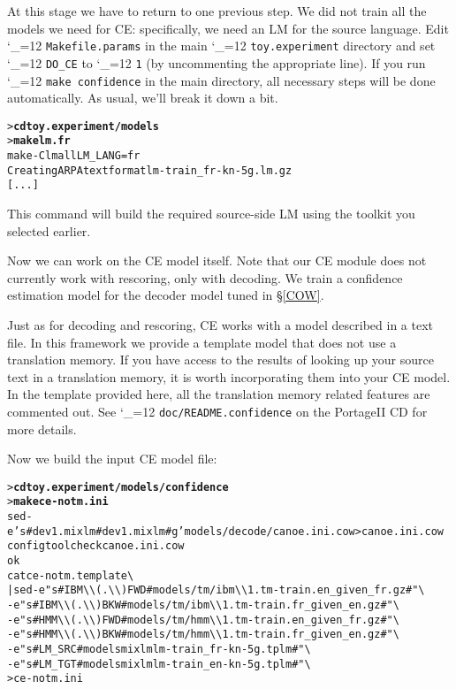 \documentclass[11pt,letterpaper]{article}
\newcommand{\bs}{\textbackslash{}}
\newcommand{\PS}{PortageII\xspace}
\def\code{\begingroup\catcode`\_=12 \codex}
\newcommand{\codex}[1]{\texttt{#1}\endgroup}
\begin{document}
At this stage we have to return to one previous step. We did not train all
the models we need for CE: specifically, we need an LM for the source language.
Edit \code{Makefile.params} in the main \code{toy.experiment} directory and set
\code{DO_CE} to \code{1} (by uncommenting the appropriate line). If you run
\code{make confidence} in the main directory, all necessary steps will be done
automatically.  As usual, we'll break it down a bit.
\begin{small}
\begin{alltt}
   > \textbf{cd toy.experiment/models}
   > \textbf{make lm.fr}
   make -C lm all LM_LANG=fr
   Creating ARPA text format lm-train_fr-kn-5g.lm.gz
   [...]
\end{alltt}
\end{small}
This command will build the required source-side LM using the toolkit you
selected earlier.

Now we can work on the CE model itself. Note that our CE module does not
currently work with rescoring, only with decoding. We train a confidence
estimation model for the decoder model tuned in \S\ref{COW}.

Just as for decoding and rescoring, CE works with a model described in a text
file.  In this framework we provide a template model that does not use a
translation memory.  If you have access to the results of looking up your
source text in a translation memory, it is worth incorporating them into your
CE model.  In the template provided here, all the translation memory related
features are commented out.  See \code{doc/README.confidence} on the \PS CD for
more details.

Now we build the input CE model file:
\begin{small}
\begin{alltt}
   > \textbf{cd toy.experiment/models/confidence}
   > \textbf{make ce-notm.ini}
   sed -e 's#dev1.mixlm#dev1.mixlm#g' models/decode/canoe.ini.cow > canoe.ini.cow
   configtool check canoe.ini.cow
   ok
   cat ce-notm.template \bs
      | sed -e "s#IBM\bs\bs(.\bs\bs)FWD#models/tm/ibm\bs\bs1.tm-train.en_given_fr.gz#" \bs
            -e "s#IBM\bs\bs(.\bs\bs)BKW#models/tm/ibm\bs\bs1.tm-train.fr_given_en.gz#" \bs
            -e "s#HMM\bs\bs(.\bs\bs)FWD#models/tm/hmm\bs\bs1.tm-train.en_given_fr.gz#" \bs
            -e "s#HMM\bs\bs(.\bs\bs)BKW#models/tm/hmm\bs\bs1.tm-train.fr_given_en.gz#" \bs
            -e "s#LM_SRC#models\/mixlm\/lm-train_fr-kn-5g.tplm#" \bs
            -e "s#LM_TGT#models\/mixlm\/lm-train_en-kn-5g.tplm#" \bs
      > ce-notm.ini
\end{alltt}
\end{small}
\end{document}
